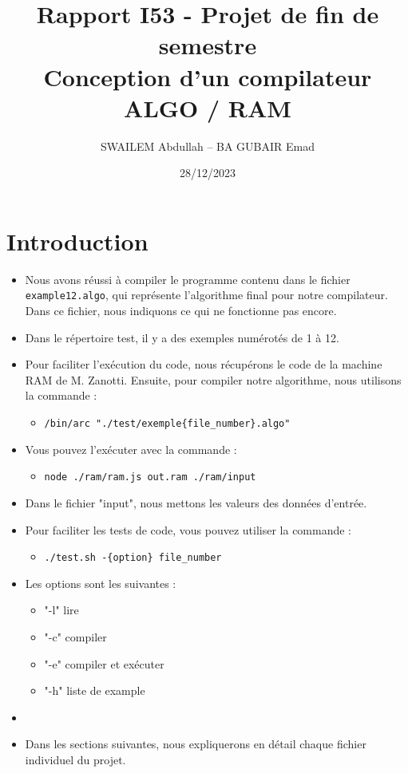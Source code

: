 \documentclass[a4paper,10pt]{article}
\title{Rapport I53 - Projet de fin de semestre\\Conception d'un compilateur ALGO / RAM}
\author{SWAILEM Abdullah – BA GUBAIR Emad}
\date{28/12/2023}
\begin{document}
\maketitle

\section*{Introduction}
\begin{itemize}
    \item Nous avons réussi à compiler le programme contenu dans le fichier \texttt{example12.algo}, qui représente l'algorithme final pour notre compilateur. Dans ce fichier, nous indiquons ce qui ne fonctionne pas encore.
    \item Dans le répertoire test, il y a des exemples numérotés de 1 à 12.
    \item Pour faciliter l'exécution du code, nous récupérons le code de la machine RAM de M. Zanotti. Ensuite, pour compiler notre algorithme, nous utilisons la commande :
    \begin{itemize}
        \item \texttt{/bin/arc "./test/exemple\{file\_number\}.algo"}
    \end{itemize}



    \item Vous pouvez l'exécuter avec la commande :
        \begin{itemize}
            \item  \texttt{node ./ram/ram.js out.ram ./ram/input}
        \end{itemize}
    \item Dans le fichier "input", nous mettons les valeurs des données d'entrée.

    \item Pour faciliter les tests de code, vous pouvez utiliser la commande :
    \begin{itemize}
        \item \texttt{./test.sh -\{option\} file\_number}
    \end{itemize}

\item Les options sont les suivantes :

    \begin{itemize}
       \item "-l"  lire
       \item  "-c"  compiler
       \item "-e"  compiler et exécuter
       \item "-h"  liste de example

    \end{itemize}
\item

\item Dans les sections suivantes, nous expliquerons en détail chaque fichier individuel du projet.
\end{itemize}
\end{document}
